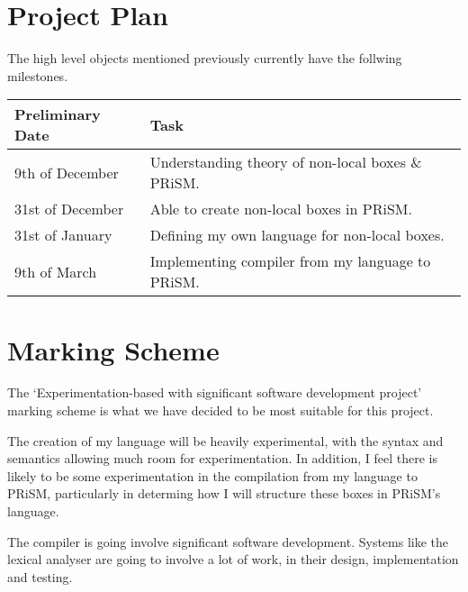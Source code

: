 \documentclass[11pt, a4paper]{article}
\begin{document}
\section{Project Plan} %
\label{sec:project_plan}
The high level objects mentioned previously currently have the follwing
milestones.

\begin{center}
    \begin{tabular}{l | p{7.5cm}}
        Preliminary Date & Task \\
        \hline
        9th of December & Understanding theory of non-local boxes \& PRiSM. \\

        31st of December & Able to create non-local boxes in PRiSM. \\

        31st of January & Defining my own language for non-local boxes. \\

        9th of March & Implementing compiler from my language to PRiSM. \\
\end{tabular}
\end{center}


\section{Marking Scheme} %
\label{sec:marking_scheme}
The `Experimentation-based with significant software development project'
marking scheme is what we have decided to be most suitable for this project.

The creation of my language will be heavily experimental, with the syntax and
semantics allowing much room for experimentation. In addition, I feel there is
likely to be some experimentation in the compilation from my language to PRiSM,
particularly in determing how I will structure these boxes in PRiSM's language.

The compiler is going involve significant software development. Systems like the
lexical analyser are going to involve a lot of work, in their design,
implementation and testing.




\end{document}
